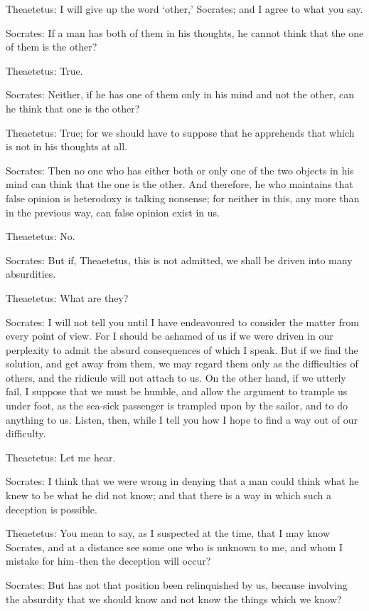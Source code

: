 Theaetetus: I will give up the word `other,' Socrates; and I agree to
what you say.

Socrates: If a man has both of them in his thoughts, he cannot think
that the one of them is the other?

Theaetetus: True.

Socrates: Neither, if he has one of them only in his mind and not the
other, can he think that one is the other?

Theaetetus: True; for we should have to suppose that he apprehends that
which is not in his thoughts at all.

Socrates: Then no one who has either both or only one of the two objects
in his mind can think that the one is the other. And therefore, he who
maintains that false opinion is heterodoxy is talking nonsense; for
neither in this, any more than in the previous way, can false opinion
exist in us.

Theaetetus: No.

Socrates: But if, Theaetetus, this is not admitted, we shall be driven
into many absurdities.

Theaetetus: What are they?

Socrates: I will not tell you until I have endeavoured to consider the
matter from every point of view. For I should be ashamed of us if we
were driven in our perplexity to admit the absurd consequences of which
I speak. But if we find the solution, and get away from them, we may
regard them only as the difficulties of others, and the ridicule will
not attach to us. On the other hand, if we utterly fail, I suppose that
we must be humble, and allow the argument to trample us under foot,
as the sea-sick passenger is trampled upon by the sailor, and to do
anything to us. Listen, then, while I tell you how I hope to find a way
out of our difficulty.

Theaetetus: Let me hear.

Socrates: I think that we were wrong in denying that a man could think
what he knew to be what he did not know; and that there is a way in
which such a deception is possible.

Theaetetus: You mean to say, as I suspected at the time, that I may know
Socrates, and at a distance see some one who is unknown to me, and whom
I mistake for him--then the deception will occur?

Socrates: But has not that position been relinquished by us, because
involving the absurdity that we should know and not know the things
which we know?

